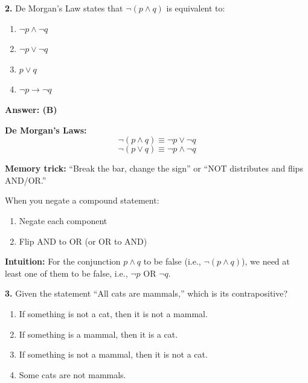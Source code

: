 \documentclass[11pt,a4paper]{article}
\begin{document}
\vspace{10pt}

\textbf{2.} De Morgan's Law states that $\neg(p \land q)$ is equivalent to:

\begin{enumerate}[label=(\Alph*),noitemsep]
    \item $\neg p \land \neg q$
    \item $\neg p \lor \neg q$
    \item $p \lor q$
    \item $\neg p \to \neg q$
\end{enumerate}

\begin{solnbox}
\textbf{Answer: (B)}

\textbf{De Morgan's Laws:}
$$\neg(p \land q) \equiv \neg p \lor \neg q$$
$$\neg(p \lor q) \equiv \neg p \land \neg q$$

\textbf{Memory trick:} ``Break the bar, change the sign'' or ``NOT distributes and flips AND/OR.''

When you negate a compound statement:
\begin{enumerate}[noitemsep]
    \item Negate each component
    \item Flip AND to OR (or OR to AND)
\end{enumerate}

\textbf{Intuition:} For the conjunction $p \land q$ to be false (i.e., $\neg(p \land q)$), we need at least one of them to be false, i.e., $\neg p$ OR $\neg q$.
\end{solnbox}

\vspace{10pt}

\textbf{3.} Given the statement ``All cats are mammals,'' which is its contrapositive?

\begin{enumerate}[label=(\Alph*),noitemsep]
    \item If something is not a cat, then it is not a mammal.
    \item If something is a mammal, then it is a cat.
    \item If something is not a mammal, then it is not a cat.
    \item Some cats are not mammals.
\end{enumerate}
\end{document}

